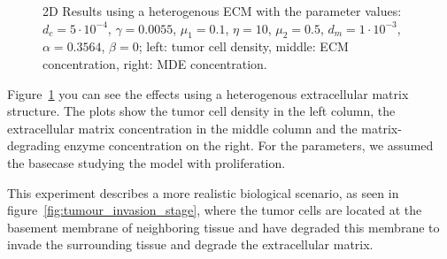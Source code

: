 \begin{figure}[h!]
 \centering
 \caption{2D Results using a heterogenous ECM with the parameter values: $d_c=5\cdot 10^{-4}$, $\gamma=0.0055$, $\mu_1 = 0.1$, $\eta=10$, $\mu_2=0.5$, $d_m = 1\cdot 10^{-3}$, $\alpha = 0.3564$, $\beta = 0$; left: tumor cell density, middle: ECM concentration, right: MDE concentration.}
 \label{fig:2D_heterogenous_ECM}
\end{figure}
Figure~\ref{fig:2D_heterogenous_ECM} you can see the effects using a heterogenous extracellular matrix structure. The plots show the tumor cell density in the left column, the extracellular matrix concentration in the middle column and the matrix-degrading enzyme concentration on the right. For the parameters, we assumed the basecase studying the model with proliferation. 

This experiment describes a more realistic biological scenario, as seen in figure~\ref{fig:tumour_invasion_stage}, where the tumor cells are located at the basement membrane of neighboring tissue and have degraded this membrane to invade the surrounding tissue and degrade the extracellular matrix.

